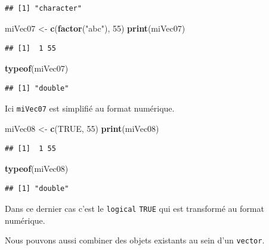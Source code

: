 \documentclass[twoside,symmetric]{book}
\newenvironment{Shaded}{}{}
\newcommand{\DecValTok}[1]{#1}
\newcommand{\KeywordTok}[1]{\textbf{#1}}
\newcommand{\NormalTok}[1]{#1}
\newcommand{\OtherTok}[1]{#1}
\newcommand{\StringTok}[1]{#1}
\begin{document}
\begin{verbatim}
## [1] "character"
\end{verbatim}

\begin{Shaded}
\begin{Highlighting}[]
\NormalTok{miVec07 <-}\StringTok{ }\KeywordTok{c}\NormalTok{(}\KeywordTok{factor}\NormalTok{(}\StringTok{"abc"}\NormalTok{), }\DecValTok{55}\NormalTok{)}
\KeywordTok{print}\NormalTok{(miVec07)}
\end{Highlighting}
\end{Shaded}

\begin{verbatim}
## [1]  1 55
\end{verbatim}

\begin{Shaded}
\begin{Highlighting}[]
\KeywordTok{typeof}\NormalTok{(miVec07)}
\end{Highlighting}
\end{Shaded}

\begin{verbatim}
## [1] "double"
\end{verbatim}

Ici \texttt{miVec07} est simplifié au format numérique.

\begin{Shaded}
\begin{Highlighting}[]
\NormalTok{miVec08 <-}\StringTok{ }\KeywordTok{c}\NormalTok{(}\OtherTok{TRUE}\NormalTok{, }\DecValTok{55}\NormalTok{)}
\KeywordTok{print}\NormalTok{(miVec08)}
\end{Highlighting}
\end{Shaded}

\begin{verbatim}
## [1]  1 55
\end{verbatim}

\begin{Shaded}
\begin{Highlighting}[]
\KeywordTok{typeof}\NormalTok{(miVec08)}
\end{Highlighting}
\end{Shaded}

\begin{verbatim}
## [1] "double"
\end{verbatim}

Dans ce dernier cas c'est le \texttt{logical} \texttt{TRUE} qui est transformé au format numérique.

Nous pouvons aussi combiner des objets existants au sein d'un \texttt{vector}.
\end{document}
